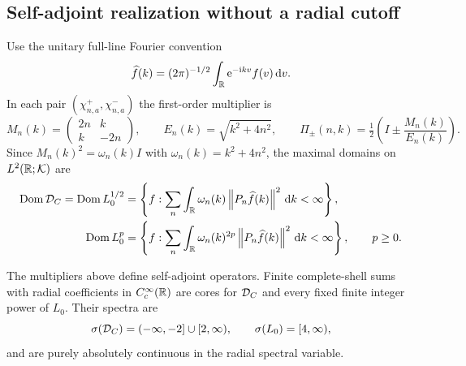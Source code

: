 \subsection{Self-adjoint realization without a radial cutoff}

Use the unitary full-line Fourier convention
\begin{equation}
 \widehat f(k)=(2\pi)^{-1/2}\int_\mathbb R\mathrm e^{-\mathrm i kv}f(v)\,\mathrm d v.
 \label{eq:fourier}
\end{equation}
In each pair $(\chi^+_{n,a},\chi^-_{n,a})$ the first-order multiplier is
\begin{equation}
 M_n(k)=\begin{pmatrix}2n&k\\k&-2n\end{pmatrix},\qquad
 E_n(k)=\sqrt{k^2+4n^2},\qquad
 \Pi_\pm(n,k)=\tfrac12\left(I\pm\frac{M_n(k)}{E_n(k)}\right).
 \label{eq:signed-block}
\end{equation}
Since $M_n(k)^2=\omega_n(k)I$ with $\omega_n(k)=k^2+4n^2$,
the maximal domains on $L^2(\mathbb R;\mathcal K)$ are
\begin{align}
 \operatorname{Dom}\mathcal D_C=\operatorname{Dom} L_0^{1/2}
 &=\left\{f:\sum_n\int_\mathbb R\omega_n(k)
           \left\lVert P_n\widehat f(k)\right\rVert^2\,\mathrm d k<\infty\right\},
 \label{eq:dirac-domain}\\
 \operatorname{Dom} L_0^p
 &=\left\{f:\sum_n\int_\mathbb R\omega_n(k)^{2p}
           \left\lVert P_n\widehat f(k)\right\rVert^2\,\mathrm d k<\infty\right\},
 \qquad p\ge0.
 \label{eq:square-domain}
\end{align}

\begin{proposition}
\label{prop:complete-realization}
The multipliers above define self-adjoint operators. Finite complete-shell
sums with radial coefficients in $C_c^\infty(\mathbb R)$ are cores for $\mathcal D_C$
and every fixed finite integer power of $L_0$. Their spectra are
\begin{equation}
 \sigma(\mathcal D_C)=(-\infty,-2]\cup[2,\infty),\qquad
 \sigma(L_0)=[4,\infty),
 \label{eq:spectra}
\end{equation}
and are purely absolutely continuous in the radial spectral variable.
\end{proposition}


